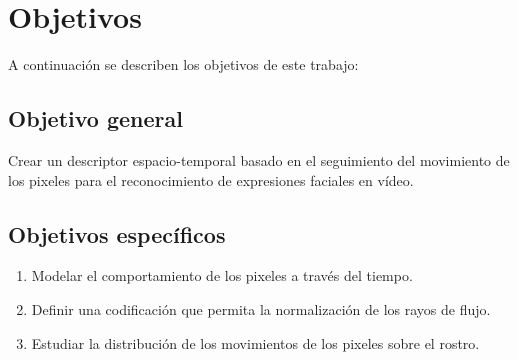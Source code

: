 \section{Objetivos}
\label{subsec:objetivos}
A continuación se describen los objetivos de este trabajo:

\subsection{Objetivo general}
\label{subsubsec:objgeneral}
Crear un descriptor espacio-temporal basado en el seguimiento del movimiento de los pixeles para el reconocimiento de expresiones faciales en vídeo.


\subsection{Objetivos específicos}
\label{subsubsec:objgeneral}
	\begin{enumerate}
		\item Modelar el comportamiento de los pixeles a través del tiempo.
		\item Definir una codificación que permita la normalización de los rayos de flujo.
		\item Estudiar la distribución de los movimientos de los pixeles sobre el rostro.
	\end{enumerate}